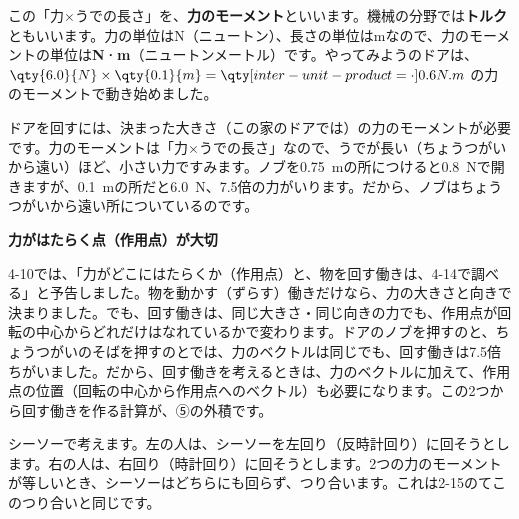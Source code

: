 \par\vspace{4pt}
この「力×うでの長さ」を、\textbf{力のモーメント}といいます。機械の分野では\textbf{トルク}ともいいます。力の単位はN（ニュートン）、長さの単位はmなので、力のモーメントの単位は\textbf{N·m}（ニュートンメートル）です。やってみようのドアは、$\qty{6.0}{N}\times\qty{0.1}{m}=\bkivoNm{0.6}$ の力のモーメントで動き始めました。

ドアを回すには、決まった大きさ（この家のドアでは）の力のモーメントが必要です。力のモーメントは「力×うでの長さ」なので、うでが長い（ちょうつがいから遠い）ほど、小さい力ですみます。ノブを\qty{0.75}{m}の所につけると\qty{0.8}{N}で開きますが、\qty{0.1}{m}の所だと\qty{6.0}{N}、7.5倍の力がいります。だから、ノブはちょうつがいから遠い所についているのです。

\begin{seikaku}
\textbf{力がはたらく点（作用点）が大切}\par
4-10では、「力がどこにはたらくか（作用点）と、物を回す働きは、4-14で調べる」と予告しました。物を動かす（ずらす）働きだけなら、力の大きさと向きで決まりました。でも、回す働きは、同じ大きさ・同じ向きの力でも、作用点が回転の中心からどれだけはなれているかで変わります。ドアのノブを押すのと、ちょうつがいのそばを押すのとでは、力のベクトルは同じでも、回す働きは7.5倍ちがいました。だから、回す働きを考えるときは、力のベクトルに加えて、作用点の位置（回転の中心から作用点へのベクトル）も必要になります。この2つから回す働きを作る計算が、⑤の外積です。
\end{seikaku}

シーソーで考えます。左の人は、シーソーを左回り（反時計回り）に回そうとします。右の人は、右回り（時計回り）に回そうとします。2つの力のモーメントが等しいとき、シーソーはどちらにも回らず、つり合います。これは2-15のてこのつり合いと同じです。

